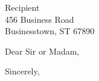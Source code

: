 \documentclass{letter}
\begin{document}
\begin{letter}{Recipient\\456 Business Road\\Businesstown, ST 67890}

\opening{Dear Sir or Madam,}


\closing{Sincerely,}

\end{letter}
\end{document}
